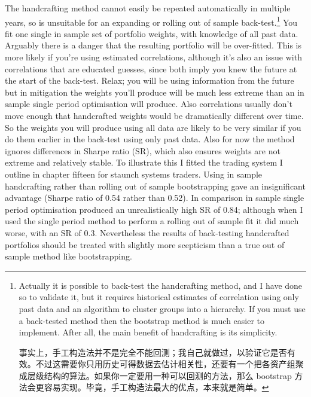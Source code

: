 \begin{englishblock} The handcrafting method cannot easily be repeated automatically in multiple years, so is unsuitable for an expanding or rolling out of sample back-test.\footnote{Actually it is possible to back-test the handcrafting method, and I have done so to validate it, but it requires historical estimates of correlation using only past data and an algorithm to cluster groups into a hierarchy. If you must use a back-tested method then the bootstrap method is much easier to implement. After all, the main benefit of handcrafting is its simplicity. \par 事实上，手工构造法并不是完全不能回测；我自己就做过，以验证它是否有效。不过这需要你只用历史可得数据去估计相关性，还要有一个把各资产组聚成层级结构的算法。如果你一定要用一种可以回测的方法，那么 bootstrap 方法会更容易实现。毕竟，手工构造法最大的优点，本来就是简单。} You fit one single in sample set of portfolio weights, with knowledge of all past data. Arguably there is a danger that the resulting portfolio will be over-fitted. This is more likely if you're using estimated correlations, although it's also an issue with correlations that are educated guesses, since both imply you knew the future at the start of the back-test. Relax; you will be using information from the future but in mitigation the weights you'll produce will be much less extreme than an in sample single period optimisation will produce. Also correlations usually don't move enough that handcrafted weights would be dramatically different over time. So the weights you will produce using all data are likely to be very similar if you do them earlier in the back-test using only past data. Also for now the method ignores differences in Sharpe ratio (SR), which also ensures weights are not extreme and relatively stable. To illustrate this I fitted the trading system I outline in chapter fifteen for staunch systems traders. Using in sample handcrafting rather than rolling out of sample bootstrapping gave an insignificant advantage (Sharpe ratio of 0.54 rather than 0.52). In comparison in sample single period optimisation produced an unrealistically high SR of 0.84; although when I used the single period method to perform a rolling out of sample fit it did much worse, with an SR of 0.3. Nevertheless the results of back-testing handcrafted portfolios should be treated with slightly more scepticism than a true out of sample method like bootstrapping. \end{englishblock}


